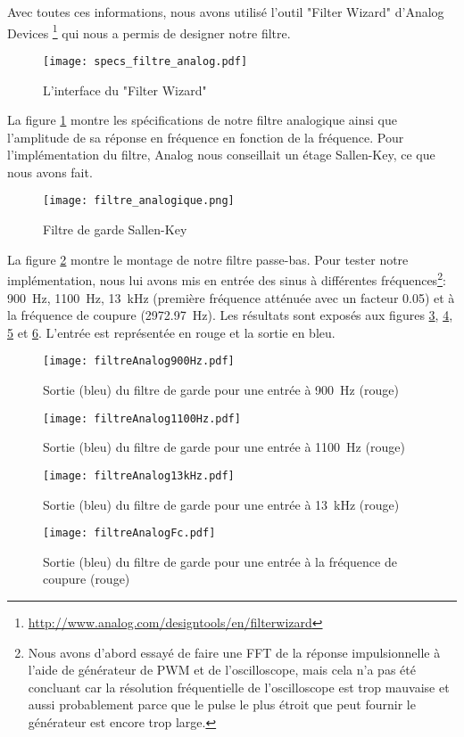 Avec toutes ces informations, nous avons utilisé l'outil "Filter Wizard" d'Analog Devices \footnote{\url{http://www.analog.com/designtools/en/filterwizard}} qui nous a permis de designer notre filtre.
\begin{figure}[htbp]
\centering
\texttt{[image: specs\_filtre\_analog.pdf]}
\caption{L'interface du "Filter Wizard"}
\label{fig:specsAnalogFilter}
\end{figure}
La figure \ref{fig:specsAnalogFilter} montre les spécifications de notre filtre analogique ainsi que l'amplitude de sa réponse en fréquence en fonction de la fréquence. Pour l'implémentation du filtre, Analog nous conseillait un étage Sallen-Key, ce que nous avons fait.
\begin{figure}[htbp]
\centering
\texttt{[image: filtre\_analogique.png]}
\caption{Filtre de garde Sallen-Key}
\label{fig:filtreAnalogique}
\end{figure}
La figure \ref{fig:filtreAnalogique} montre le montage de notre filtre passe-bas. Pour tester notre implémentation, nous lui avons mis en entrée des sinus à différentes fréquences\footnote{Nous avons d'abord essayé de faire une FFT de la réponse impulsionnelle à l'aide de générateur de PWM et de l'oscilloscope, mais cela n'a pas été concluant car la résolution fréquentielle de l'oscilloscope est trop mauvaise et aussi probablement parce que le pulse le plus étroit que peut fournir le générateur est encore trop large.}: \SI{900}{\hertz}, \SI{1100}{\hertz}, \SI{13}{\kilo\hertz} (première fréquence atténuée avec un facteur 0.05) et à la fréquence de coupure (\SI{2972.97}{\hertz}). Les résultats sont exposés aux figures \ref{fig:filtreAnalog900Hz}, \ref{fig:filtreAnalog1100Hz}, \ref{fig:filtreAnalog13kHz} et \ref{fig:filtreAnalogFc}. L'entrée est représentée en rouge et la sortie en bleu.
\begin{figure}[htbp]
\centering
\texttt{[image: filtreAnalog900Hz.pdf]}
\caption{Sortie (bleu) du filtre de garde pour une entrée à \SI{900}{\hertz} (rouge)}
\label{fig:filtreAnalog900Hz}
\end{figure}
\begin{figure}[htbp]
\centering
\texttt{[image: filtreAnalog1100Hz.pdf]}
\caption{Sortie (bleu) du filtre de garde pour une entrée à \SI{1100}{\hertz} (rouge)}
\label{fig:filtreAnalog1100Hz}
\end{figure}
\begin{figure}[htbp]
\centering
\texttt{[image: filtreAnalog13kHz.pdf]}
\caption{Sortie (bleu) du filtre de garde pour une entrée à \SI{13}{\kilo\hertz} (rouge)}
\label{fig:filtreAnalog13kHz}
\end{figure}
\begin{figure}[htbp]
\centering
\texttt{[image: filtreAnalogFc.pdf]}
\caption{Sortie (bleu) du filtre de garde pour une entrée à la fréquence de coupure (rouge)}
\label{fig:filtreAnalogFc}
\end{figure}

